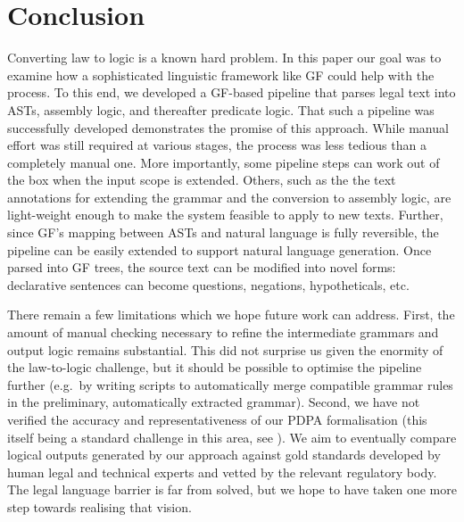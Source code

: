 \documentclass{IOS-Book-Article}
\newcommand{\todoj}[1]{{\color{red}\textbf{[J: #1]}}}
\begin{document}
\section{Conclusion}
\label{sec:discussion}
Converting law to logic is a known hard problem. In this paper our goal was to examine how a sophisticated linguistic framework like GF could help with the process. To this end, we developed a GF-based pipeline that parses legal text into ASTs, assembly logic, and thereafter predicate logic. That such a pipeline was successfully developed demonstrates the promise of this approach. While manual effort was still required at various stages, the process was less tedious than a completely manual one. More importantly, some pipeline steps can work out of the box when the input scope is extended. Others, such as the the text annotations for extending the grammar and the conversion to assembly logic, are light-weight enough to make the system feasible to apply to new texts. Further, since GF's mapping between ASTs and natural language is fully reversible, the pipeline can be easily extended to support natural language generation. Once parsed into GF trees, the source text can be modified into novel forms: declarative sentences can become questions, negations, hypotheticals, etc. 

There remain a few limitations which we hope future work can address. First, the amount of manual checking necessary to refine the intermediate grammars and output logic remains substantial. This did not surprise us given the enormity of the law-to-logic challenge, but it should be possible to optimise the pipeline further (e.g.\ by writing scripts to automatically merge compatible grammar rules in the preliminary, automatically extracted grammar). Second, we have not verified the accuracy and representativeness of our PDPA formalisation (this itself being a standard challenge in this area, see \cite{wyner_study_2013}). We aim to eventually compare logical outputs generated by our approach against gold standards developed by human legal and technical experts and vetted by the relevant regulatory body. The legal language barrier is far from solved, but we hope to have taken one more step towards realising that vision.


\end{document}
